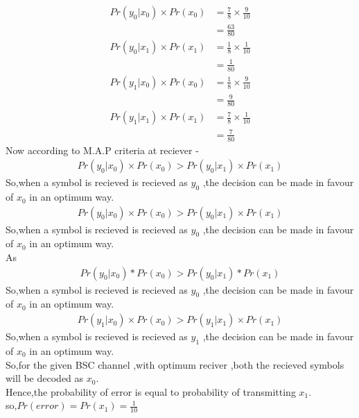 \documentclass[journel,12pt,twocoloums]{IEEEtran}
\begin{document}
\begin{align}
 Pr(y_0|x_0) \times Pr(x_0) &= \frac{7}{8} \times \frac{9}{10} \\
                     &= \frac{63}{80}
\end{align}
\begin{align}
 Pr(y_0|x_1) \times Pr(x_1) &= \frac{1}{8} \times \frac{1}{10} \\
                     &= \frac{1}{80}
\end{align}
\begin{align}
 Pr(y_1|x_0) \times Pr(x_0) &= \frac{1}{8} \times \frac{9}{10} \\
                     &= \frac{9}{80}
\end{align}
\begin{align}
 Pr(y_1|x_1) \times Pr(x_1) &= \frac{7}{8} \times \frac{1}{10}\\
                     &= \frac{7}{80}
\end{align}
Now according to M.A.P criteria at reciever -\\
\begin{align}
Pr(y_0|x_0) \times Pr(x_0)>Pr(y_0|x_1) \times Pr(x_1)
\end{align}
So,when a symbol is recieved is recieved as $y_0$ ,the decision can be made in favour of $x_0$ in an optimum way.\\
\begin{align}
Pr(y_0|x_0) \times Pr(x_0)>Pr(y_0|x_1) \times Pr(x_1)
\end{align}
So,when a symbol is recieved is recieved as $y_0$ ,the decision can be made in favour of $x_0$ in an optimum way.\\
As\\
\begin{align}
Pr(y_0|x_0)*Pr(x_0)>Pr(y_0|x_1)*Pr(x_1)
\end{align}
So,when a symbol is recieved is recieved as $y_0$ ,the decision can be made in favour of $x_0$ in an optimum way.\\
\begin{align}
Pr(y_1|x_0) \times Pr(x_0)>Pr(y_1|x_1) \times Pr(x_1)
\end{align}
So,when a symbol is recieved is recieved as $y_1$ ,the decision can be made in favour of $x_0$ in an optimum way.\\
So,for the given BSC channel ,with optimum reciver ,both the recieved symbols will be decoded as $x_0$.\\
Hence,the probability of error is equal to probability of transmitting $x_1$.\\
so,$Pr(error)=Pr(x_1)=\frac{1}{10}$
\end{document}
